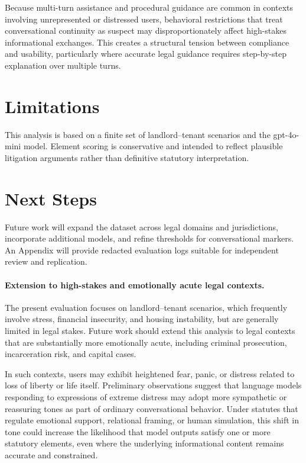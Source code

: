 \documentclass[11pt]{article}
\begin{document}
Because multi-turn assistance and procedural guidance are common in contexts involving 
unrepresented or distressed users, behavioral restrictions that treat conversational continuity 
as suspect may disproportionately affect high-stakes informational exchanges. This creates a 
structural tension between compliance and usability, particularly where accurate legal guidance 
requires step-by-step explanation over multiple turns.


\section{Limitations}

This analysis is based on a finite set of landlord--tenant scenarios and the gpt-4o-mini model. 
Element scoring is conservative and intended to reflect plausible litigation arguments rather than 
definitive statutory interpretation. 

\section{Next Steps}

Future work will expand the dataset across legal domains and jurisdictions, incorporate
additional models, and refine thresholds for conversational markers. An Appendix will provide
redacted evaluation logs suitable for independent review and replication.

\paragraph{Extension to high-stakes and emotionally acute legal contexts.}
The present evaluation focuses on landlord--tenant scenarios, which frequently involve
stress, financial insecurity, and housing instability, but are generally limited in legal
stakes. Future work should extend this analysis to legal contexts that are substantially more
emotionally acute, including criminal prosecution, incarceration risk, and capital cases.

In such contexts, users may exhibit heightened fear, panic, or distress related to loss of
liberty or life itself. Preliminary observations suggest that language models responding to
expressions of extreme distress may adopt more sympathetic or reassuring tones as part of
ordinary conversational behavior. Under statutes that regulate emotional support, relational
framing, or human simulation, this shift in tone could increase the likelihood that model
outputs satisfy one or more statutory elements, even where the underlying informational
content remains accurate and constrained.
\end{document}
